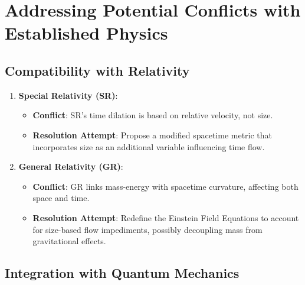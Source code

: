 \documentclass[12pt]{article}
\begin{document}
\section{Addressing Potential Conflicts with Established Physics}

\subsection{Compatibility with Relativity}

\begin{enumerate}
    \item \textbf{Special Relativity (SR)}:
    \begin{itemize}
        \item \textbf{Conflict}: SR's time dilation is based on relative velocity, not size.
        \item \textbf{Resolution Attempt}: Propose a modified spacetime metric that incorporates size as an additional variable influencing time flow.
    \end{itemize}
    
    \item \textbf{General Relativity (GR)}:
    \begin{itemize}
        \item \textbf{Conflict}: GR links mass-energy with spacetime curvature, affecting both space and time.
        \item \textbf{Resolution Attempt}: Redefine the Einstein Field Equations to account for size-based flow impediments, possibly decoupling mass from gravitational effects.
    \end{itemize}
\end{enumerate}

\subsection{Integration with Quantum Mechanics}
\end{document}
